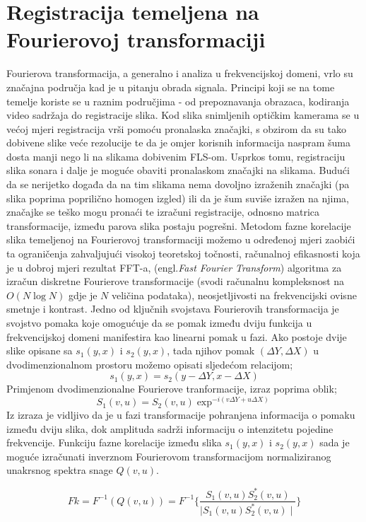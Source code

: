 \documentclass[times, utf8, diplomski]{fer}
\begin{document}
\section{Registracija temeljena na Fourierovoj transformaciji}
Fourierova transformacija, a generalno i analiza u frekvencijskoj domeni, vrlo su značajna područja kad je u pitanju obrada signala. Principi koji se na tome temelje koriste se u raznim područjima - od prepoznavanja obrazaca, kodiranja video sadržaja do registracije slika. Kod slika snimljenih optičkim kamerama se u većoj mjeri registracija vrši pomoću pronalaska značajki, s obzirom da su tako dobivene slike veće rezolucije te da je omjer korisnih informacija naspram šuma dosta manji nego li na slikama dobivenim FLS-om. Usprkos tomu, registraciju slika sonara i dalje je moguće obaviti pronalaskom značajki na slikama. Budući da se nerijetko događa da na tim slikama nema dovoljno izraženih značajki (pa slika poprima poprilično homogen izgled) ili da je šum suviše izražen na njima, značajke se teško mogu pronaći te izračuni registracije, odnosno matrica transformacije, između parova slika postaju pogrešni. Metodom fazne korelacije slika temeljenoj na Fourierovoj transformaciji možemo u određenoj mjeri zaobići ta ograničenja zahvaljujući visokoj teoretskoj točnosti, računalnoj efikasnosti koja je u dobroj mjeri rezultat FFT-a, (engl.\textit{Fast Fourier Transform}) algoritma za izračun diskretne Fourierove transformacije (svodi računalnu kompleksnost na $O(N\log N)$ gdje je $N$ veličina podataka), neosjetljivosti na frekvencijski ovisne smetnje i kontrast. Jedno od ključnih svojstava Fourierovih transformacija je svojstvo pomaka koje omogućuje da se pomak između dviju funkcija u frekvencijskoj domeni manifestira kao linearni pomak u fazi. Ako postoje dvije slike opisane sa $s_1(y,x)$ i $s_2(y,x)$, tada njihov pomak $(\Delta Y,\Delta X)$ u dvodimenzionalnom prostoru možemo opisati sljedećom relacijom;
$$ s_1(y,x) = s_2(y-\Delta Y,x-\Delta X) $$
Primjenom dvodimenzionalne Fourierove tranformacije, izraz poprima oblik;
$$ S_1(v,u) = S_2(v,u) \exp^{-i(v \Delta Y + u \Delta X)} $$
Iz izraza je vidljivo da je u fazi transformacije pohranjena informacija o pomaku između dviju slika, dok amplituda sadrži informaciju o intenzitetu pojedine frekvencije. Funkciju fazne korelacije između slika $s_1(y,x)$ i $s_2(y,x)$ sada je moguće izračunati inverznom Fourierovom transformacijom normaliziranog unakrsnog spektra snage $Q(v,u)$.

$$ Fk = F^{-1}(Q(v,u)) = F^{-1} \Bigg \{\frac{S_1(v,u) S_2^*(v,u)}{\mid S_1(v,u) S_2^*(v,u) \mid} \Bigg \} $$
\end{document}
